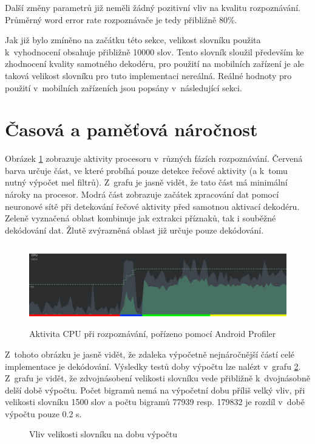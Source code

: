Další změny parametrů již neměli žádný pozitivní vliv na kvalitu rozpoznávání. Průměrný word error rate rozpoznávače je tedy přibližně 80\%.

Jak již bylo zmíněno na začátku této sekce, velikost slovníku použita k~vyhodnocení obsahuje přibližně 10000 slov. Tento slovník sloužil především ke zhodnocení kvality samotného dekodéru, pro použití na mobilních zařízení je ale taková velikost slovníku pro tuto implementaci nereálná. Reálné hodnoty pro použití v~mobilních zařízeních jsou popsány v~následující sekci.

\section{Časová a paměťová náročnost}
Obrázek \ref{fig:cpu_activity} zobrazuje aktivity procesoru v~různých fázích rozpoznávání. Červená barva určuje část, ve které probíhá pouze detekce řečové aktivity (a k~tomu nutný výpočet mel filtrů). Z~grafu je jasně vidět, že tato část má minimální nároky na procesor. Modrá část zobrazuje začátek zpracování dat pomocí neuronové sítě při detekování řečové aktivity před samotnou aktivací dekodéru. Zeleně vyznačená oblast kombinuje jak extrakci příznaků, tak i souběžné dekódování dat. Žlutě zvýrazněná oblast již určuje pouze dekódování.

\begin{figure}[H]\label{fig:cpu_activity}
	\centering
		\includegraphics[height=3.5cm]{obrazky-figures/cpu_activity.png}
        \caption{Aktivita CPU při rozpoznávání, pořízeno pomocí Android Profiler}
\end{figure}

Z~tohoto obrázku je jasně vidět, že zdaleka výpočetně nejnáročnější částí celé implementace je dekódování. Výsledky testů doby výpočtu lze nalézt v~grafu \ref{graph:decoding_time}. Z~grafu je vidět, že zdvojnásobení velikosti slovníku vede přibližně k~dvojnásobně delší době výpočtu. Počet bigramů nemá na výpočetní dobu příliš velký vliv, při velikosti slovníku 1500 slov a počtu bigramů 77939 resp. 179832 je rozdíl v~době výpočtu pouze 0.2 s.

\begin{figure}[H]\label{graph:decoding_time}
\begin{center}
\end{center}
\caption{Vliv velikosti slovníku na dobu výpočtu}
\end{figure}

